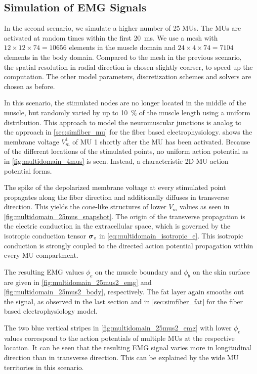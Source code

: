 \subsection{Simulation of EMG Signals}\label{sec:multidomain_simulation_emg}

In the second scenario, we simulate a higher number of 25 MUs. The MUs are activated at random times within the first \SI{20}{\ms}. We use a mesh with $12 \times 12 \times 74 = \num{10656}$ elements in the muscle domain and $24 \times 4 \times 74 = 7104$ elements in the body domain. Compared to the mesh in the previous scenario, the spatial resolution in radial direction is chosen slightly coarser, to speed up the computation.
The other model parameters, discretization schemes and solvers are chosen as before.

In this scenario, the stimulated nodes are no longer located in the middle of the muscle, but randomly varied by up to \SI{10}{\percent} of the muscle length using a uniform distribution. This approach to model the neuromuscular junctions is analog to the approach in \cref{sec:simfiber_mu} for the fiber based electrophysiology. 
 shows the membrane voltage $V_m^1$ of MU 1 shortly after the MU has been activated. Because of the different locations of the stimulated points, no uniform action potential  as in \cref{fig:multidomain_4mus} is seen. Instead, a characteristic 2D MU action potential forms. 

The spike of the depolarized membrane voltage at every stimulated point propagates along the fiber direction and additionally diffuses in  transverse direction. This yields the cone-like structures of lower $V_m$ values as  seen in \cref{fig:multidomain_25mus_snapshot}. The origin of the transverse propagation is the electric conduction in the extracellular space, which is governed by the isotropic conduction tensor $\boldsymbol{\sigma}_e$ in \cref{eq:multidomain_isotropic_e}. This isotropic conduction is strongly coupled to the directed action potential propagation within every MU compartment.

The resulting EMG values $\phi_e$ on the muscle boundary and $\phi_b$ on the skin surface are given in \cref{fig:multidomain_25mus2_emg} and \cref{fig:multidomain_25mus2_body}, respectively. The fat layer again smooths out the signal, as observed in the last section and in \cref{sec:simfiber_fat} for the fiber based electrophysiology model.

The two blue vertical stripes in \cref{fig:multidomain_25mus2_emg} with lower $\phi_e$ values correspond to the action potentials of multiple MUs at the respective location. It can be seen that the resulting EMG signal varies more in longitudinal direction than in transverse direction. This can be explained by the wide MU territories in this scenario.

